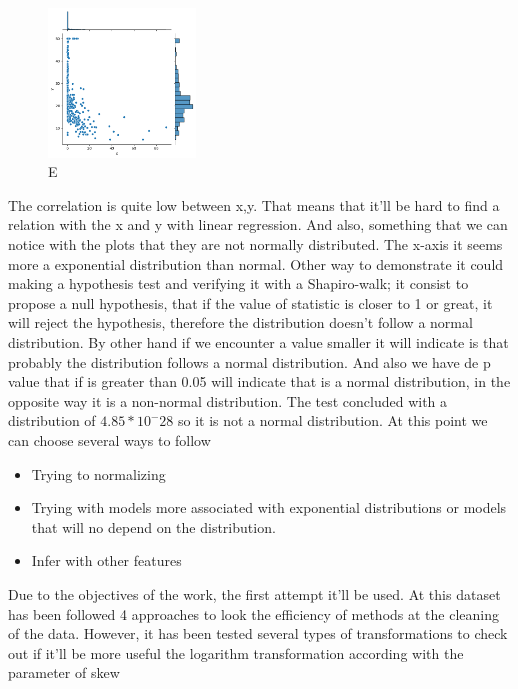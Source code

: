\documentclass{article}
\begin{document}
\begin{figure}[h]
  \centering
  \includegraphics[width=0.35\textwidth]{data1_plot1.png}
  \caption{E}
  \label{fig:ejemplo}
\end{figure}


The correlation is quite low between x,y. That means that it'll be hard to find a relation with the x and y with linear regression.
And also, something that we can notice with the plots that they are not normally distributed. The x-axis it seems more a exponential distribution than normal.
Other way to demonstrate it could making a hypothesis test and verifying it with a Shapiro-walk; it consist to propose a null hypothesis, that if the value of statistic is closer to 1 or great, it will reject the hypothesis, therefore the distribution doesn't follow a normal distribution. By other hand if we encounter a value smaller it will indicate is that probably the distribution follows a normal distribution. And also we have de p value that if is greater than 0.05 will indicate that is a normal distribution, in the opposite way it is a non-normal distribution.
The test concluded with a distribution of  $4.85*10^-28$ so it is not a normal distribution.
At this point we can choose several ways to follow
\begin{itemize}
  \item Trying to normalizing
  \item Trying with models more associated with exponential distributions or models that will no depend on the distribution.
  \item Infer with other features
\end{itemize} 
Due to the objectives of the work, the first attempt it'll be used.
At this dataset has been followed 4 approaches to look the efficiency of methods at the cleaning of the data.
However, it has been tested several types of transformations to check out if it'll be more useful the logarithm transformation according with the parameter of skew 
\end{document}
